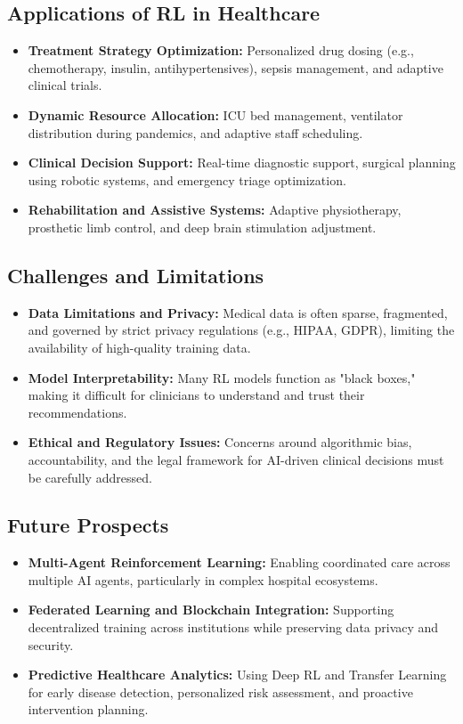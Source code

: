 \subsection{Applications of RL in Healthcare}
\begin{itemize}
    \item \textbf{Treatment Strategy Optimization:} Personalized drug dosing (e.g., chemotherapy, insulin, antihypertensives), sepsis management, and adaptive clinical trials.
    \item \textbf{Dynamic Resource Allocation:} ICU bed management, ventilator distribution during pandemics, and adaptive staff scheduling.
    \item \textbf{Clinical Decision Support:} Real-time diagnostic support, surgical planning using robotic systems, and emergency triage optimization.
    \item \textbf{Rehabilitation and Assistive Systems:} Adaptive physiotherapy, prosthetic limb control, and deep brain stimulation adjustment.
\end{itemize}

\subsection{Challenges and Limitations}
\begin{itemize}
    \item \textbf{Data Limitations and Privacy:} Medical data is often sparse, fragmented, and governed by strict privacy regulations (e.g., HIPAA, GDPR), limiting the availability of high-quality training data.
    \item \textbf{Model Interpretability:} Many RL models function as "black boxes," making it difficult for clinicians to understand and trust their recommendations.
    \item \textbf{Ethical and Regulatory Issues:} Concerns around algorithmic bias, accountability, and the legal framework for AI-driven clinical decisions must be carefully addressed.
\end{itemize}

\subsection{Future Prospects}
\begin{itemize}
    \item \textbf{Multi-Agent Reinforcement Learning:} Enabling coordinated care across multiple AI agents, particularly in complex hospital ecosystems.
    \item \textbf{Federated Learning and Blockchain Integration:} Supporting decentralized training across institutions while preserving data privacy and security.
    \item \textbf{Predictive Healthcare Analytics:} Using Deep RL and Transfer Learning for early disease detection, personalized risk assessment, and proactive intervention planning.
\end{itemize}
